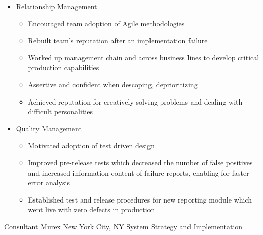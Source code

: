 \documentclass[11pt,letterpaper,roman]{moderncv}
\begin{document}
\begin{itemize}
\begin{itemize}
           \item Determined minimum acceptable scope by limiting feature creep and challenging stakeholders in order to meet aggressive deadlines
        \end{itemize}
    \item Relationship Management
        \begin{itemize}
           \item Encouraged team adoption of Agile methodologies
           \item Rebuilt team's reputation after an implementation failure
           \item Worked up management chain and across business lines to develop critical production capabilities
           \item Assertive and confident when descoping, deprioritizing
           \item Achieved reputation for creatively solving problems and dealing with difficult personalities
        \end{itemize}
    \item Quality Management
        \begin{itemize}
           \item Motivated adoption of test driven design
           \item Improved pre-release tests which decreased the number of false positives and increased information content of failure reports, enabling for faster error analysis
           \item Established test and release procedures for new reporting module which went live with zero defects in production\newline{}
        \end{itemize}
\end{itemize}
    {Consultant}
    {Murex}
    {New York City, NY}
    {}
    {System Strategy and Implementation}
\end{document}
